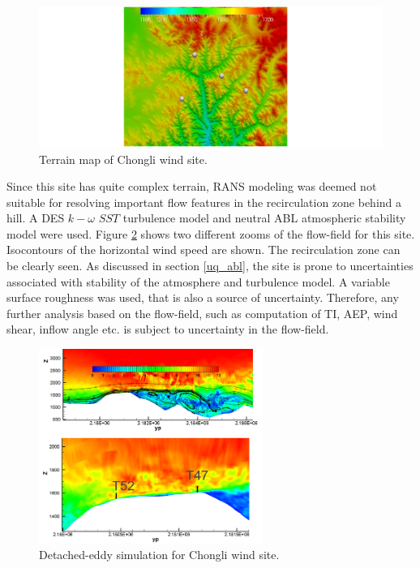 \documentclass[]{aiaa-tc}%
\begin{document}
\begin{figure}
\centering
 \includegraphics[width=1.05\textwidth]{Chongli_Terrain.png}
 \caption{Terrain map of Chongli wind site.}
 \label{f:Chongli_Terrain}
\end{figure}

Since this site has quite complex terrain, RANS modeling was deemed not suitable for resolving important flow features in the recirculation zone behind a hill. A DES  $k - \omega$  $SST$ turbulence model and neutral ABL atmospheric stability model were used. Figure \ref{f:DES_ComplexTerrain} shows two different zooms of the flow-field for this site. Isocontours of the horizontal wind speed are shown. The recirculation zone can be clearly seen. As discussed in section  \ref{uq_abl}, the site is prone to uncertainties associated with stability of the atmosphere and turbulence model. A variable surface roughness was used, that is also a source of uncertainty. Therefore, any further analysis based on the flow-field, such as computation of TI, AEP, wind shear, inflow angle etc. is subject to uncertainty in the flow-field.

\begin{figure}
\centering
 \includegraphics[width=0.65\textwidth]{DES_ComplexTerrain.png}
 \caption{Detached-eddy simulation for Chongli wind site.}
 \label{f:DES_ComplexTerrain}
\end{figure}
\end{document}
